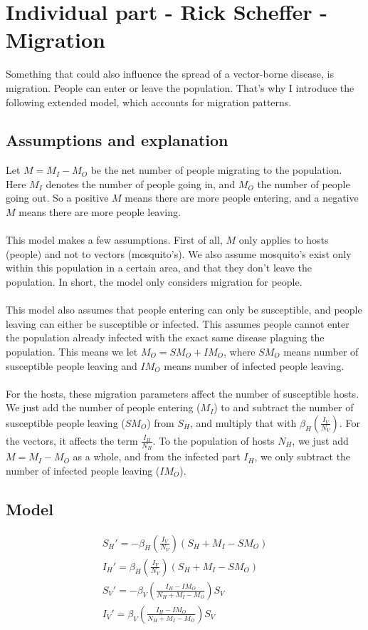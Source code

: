 
\section{Individual part - Rick Scheffer - Migration}
Something that could also influence the spread of a vector-borne disease, is migration. People can enter or leave the population. That's why I introduce the following extended model, which accounts for migration patterns.

\subsection{Assumptions and explanation}
Let $M = M_I - M_O$ be the net number of people migrating to the population. Here $M_I$ denotes the number of people going in, and $M_O$ the number of people going out. So a positive $M$ means there are more people entering, and a negative $M$ means there are more people leaving. \\\\

\noindent This model makes a few assumptions. First of all, $M$ only applies to hosts (people) and not to vectors (mosquito's). We also assume mosquito's exist only within this population in a certain area, and that they don't leave the population. In short, the model only considers migration for people. \\\\

\noindent This model also assumes that people entering can only be susceptible, and people leaving can either be susceptible or infected. This assumes people cannot enter the population already infected with the exact same disease plaguing the population. This means we let $M_O = SM_O + IM_O$, where $SM_O$ means number of susceptible people leaving and $IM_O$ means number of infected people leaving. \\\\

\noindent For the hosts, these migration parameters affect the number of susceptible hosts. We just add the number of people entering ($M_I$) to and subtract the number of susceptible people leaving ($SM_O$) from $S_H$, and multiply that with $\beta_H(\frac{I_V}{N_V})$. For the vectors, it affects the term $\frac{I_H}{N_H}$. To the population of hosts $N_H$, we just add $M = M_I - M_O$ as a whole, and from the infected part $I_H$, we only subtract the number of infected people leaving ($IM_O$). 

\subsection{Model}
\[
\begin{aligned}
    {S_H}' = - \beta_H(\frac{I_V}{N_V})(S_H + M_I - SM_O) \\
    {I_H}' = \beta_H(\frac{I_V}{N_V})(S_H + M_I - SM_O) \\
    {S_V}' = - \beta_V(\frac{I_H - IM_O}{N_H + M_I - M_O})S_V \\
    {I_V}' = \beta_V(\frac{I_H - IM_O}{N_H + M_I - M_O})S_V
\end{aligned}
\]


